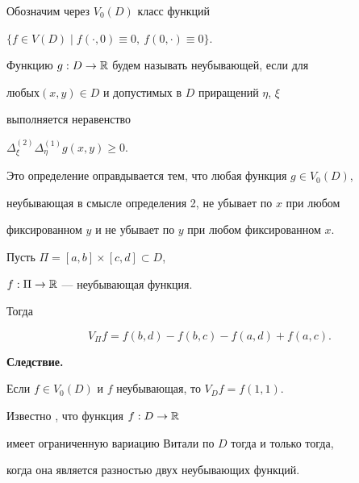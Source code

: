 Обозначим через $V_0(D)$ класс функций


$\{ f\in V(D) \mid f(\cdot, 0)\equiv 0,\ f(0, \cdot)\equiv 0\}$.





\begin{defn}


Функцию $g: D\to{\Bbb R}$ будем называть неубывающей, если для


любых\linebreak $(x,y)\in D$ и допустимых в $D$ приращений $\eta$, $\xi$


выполняется неравенство


$\Delta_{\xi}^{(2)} \Delta_{\eta}^{(1)} g(x, y) \geqslant 0$.


\end{defn}





Это определение оправдывается тем, что любая функция $g\in V_0(D)$,


неубывающая в смысле определения 2, не убывает по $x$ при любом


фиксированном $y$ и не убывает по $y$ при любом фиксированном $x$.





\begin{lem}


Пусть $\Pi=[a,b]\times[c,d] \subset D$,


$f: \Pi\to{\Bbb R}$ --- неубывающая функция.


Тогда


$$


{V_\Pi} f= f(b,d)-f(b,c)-f(a,d)+f(a,c).


$$


\end{lem}





{\bf Следствие.}


Если $f\in V_0(D)$ и $f$ неубывающая, то $V_D f=f(1,1)$.


\medskip





Известно \cite{4}, что функция $f: D\to{\Bbb R}$


имеет ограниченную вариацию Витали по $D$ тогда и только тогда,


когда она является разностью двух неубывающих функций.


